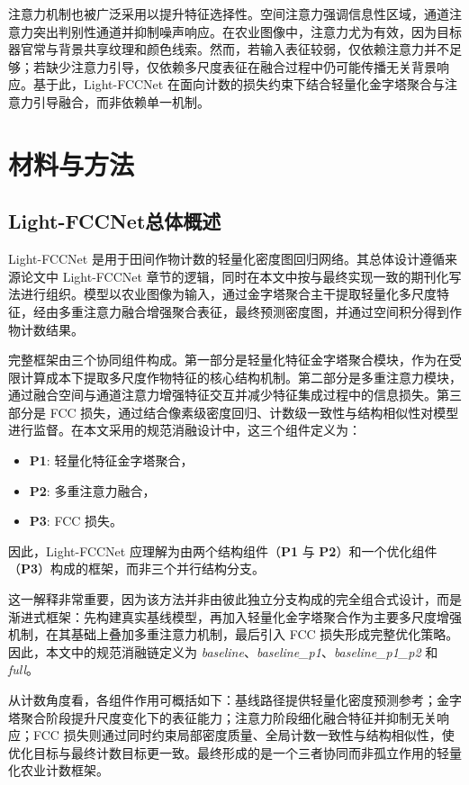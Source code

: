 \documentclass[a4paper,fleqn]{cas-sc}
\begin{document}
注意力机制也被广泛采用以提升特征选择性。空间注意力强调信息性区域，通道注意力突出判别性通道并抑制噪声响应。在农业图像中，注意力尤为有效，因为目标器官常与背景共享纹理和颜色线索。然而，若输入表征较弱，仅依赖注意力并不足够；若缺少注意力引导，仅依赖多尺度表征在融合过程中仍可能传播无关背景响应。基于此，Light-FCCNet 在面向计数的损失约束下结合轻量化金字塔聚合与注意力引导融合，而非依赖单一机制。

\section{材料与方法}

\subsection{Light-FCCNet总体概述}

Light-FCCNet 是用于田间作物计数的轻量化密度图回归网络。其总体设计遵循来源论文中 Light-FCCNet 章节的逻辑，同时在本文中按与最终实现一致的期刊化写法进行组织。模型以农业图像为输入，通过金字塔聚合主干提取轻量化多尺度特征，经由多重注意力融合增强聚合表征，最终预测密度图，并通过空间积分得到作物计数结果。

完整框架由三个协同组件构成。第一部分是轻量化特征金字塔聚合模块，作为在受限计算成本下提取多尺度作物特征的核心结构机制。第二部分是多重注意力模块，通过融合空间与通道注意力增强特征交互并减少特征集成过程中的信息损失。第三部分是 FCC 损失，通过结合像素级密度回归、计数级一致性与结构相似性对模型进行监督。在本文采用的规范消融设计中，这三个组件定义为：
\begin{itemize}
    \item \textbf{P1}: 轻量化特征金字塔聚合，
    \item \textbf{P2}: 多重注意力融合，
    \item \textbf{P3}: FCC 损失。
\end{itemize}
因此，Light-FCCNet 应理解为由两个结构组件（\textbf{P1} 与 \textbf{P2}）和一个优化组件（\textbf{P3}）构成的框架，而非三个并行结构分支。

这一解释非常重要，因为该方法并非由彼此独立分支构成的完全组合式设计，而是渐进式框架：先构建真实基线模型，再加入轻量化金字塔聚合作为主要多尺度增强机制，在其基础上叠加多重注意力机制，最后引入 FCC 损失形成完整优化策略。因此，本文中的规范消融链定义为 \textit{baseline}、\textit{baseline\_p1}、\textit{baseline\_p1\_p2} 和 \textit{full}。

从计数角度看，各组件作用可概括如下：基线路径提供轻量化密度预测参考；金字塔聚合阶段提升尺度变化下的表征能力；注意力阶段细化融合特征并抑制无关响应；FCC 损失则通过同时约束局部密度质量、全局计数一致性与结构相似性，使优化目标与最终计数目标更一致。最终形成的是一个三者协同而非孤立作用的轻量化农业计数框架。
\end{document}
